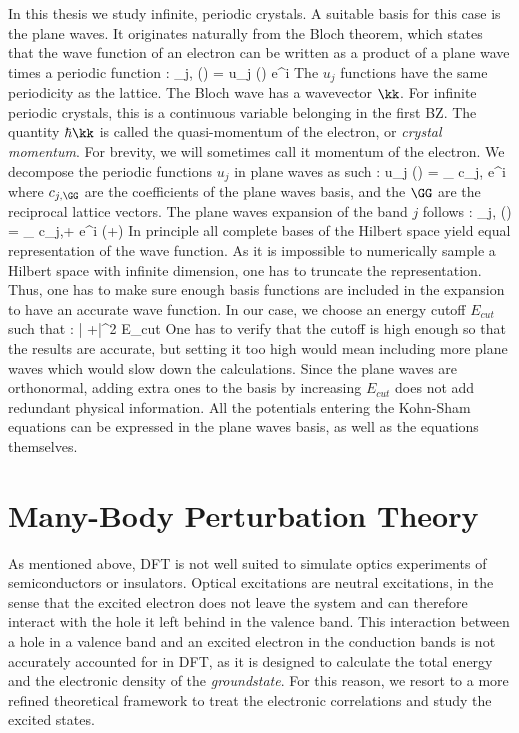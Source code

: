 In this thesis we study infinite, periodic crystals. A suitable basis for this case is the plane waves. It originates naturally from the Bloch theorem, which states that the wave function of an electron can be written as a product of a plane wave times a periodic function :
\be
 	\phi_{j,\kk} (\rr) = u_j (\rr) e^{i\kk\cdot\rr}
\ee
The $u_j$ functions have the same periodicity as the lattice. The Bloch wave has a wavevector $\kk$. For infinite periodic crystals, this is a continuous variable belonging in the first \acrfull{BZ}. The quantity $\hbar \kk$ is called the quasi-momentum of the electron, or \textit{crystal momentum}. For brevity, we will sometimes call it momentum of the electron.
We decompose the periodic functions $u_j$ in plane waves as such :
\be
 	u_j (\rr) = \sum_{\GG} c_{j,\GG} e^{i\GG \cdot \rr}
\ee
where $c_{j,\GG}$ are the coefficients of the plane waves basis, and the $\GG$ are the reciprocal lattice vectors. The plane waves expansion of the band $j$ follows :
\be
	\phi_{j,\kk} (\rr) = \sum_{\GG} c_{j,\kk+\GG} e^{i (\kk+\GG)\cdot \rr}
\ee
In principle all complete bases of the Hilbert space yield equal representation of the wave function. As it is impossible to numerically sample a Hilbert space with infinite dimension, one has to truncate the representation. Thus, one has to make sure enough basis functions are included in the expansion to have an accurate wave function. In our case, we choose an energy cutoff $E_{cut}$ such that :
\be
	 \left| \kk+\GG \right|^2 \leq E_{cut}
\ee
One has to verify that the cutoff is high enough so that the results are accurate, but setting it too high would mean including more plane waves which would slow down the calculations. Since the plane waves are orthonormal, adding extra ones to the basis by increasing $E_{cut}$ does not add redundant physical information. \cite{martin2020electronic} All the potentials entering the Kohn-Sham equations can be expressed in the plane waves basis, as well as the equations themselves.



%

\section{Many-Body Perturbation Theory}
As mentioned above, \acrshort{DFT} is not well suited to simulate optics experiments of semiconductors or insulators. Optical excitations are neutral excitations, in the sense that the excited electron does not leave the system and can therefore interact with the hole it left behind in the valence band. This interaction between a hole in a valence band and an excited electron in the conduction bands is not accurately accounted for in \acrshort{DFT}, as it is designed to calculate the total energy and the electronic density of the \textit{groundstate}. For this reason, we resort to a more refined theoretical framework to treat the electronic correlations and study the excited states.

